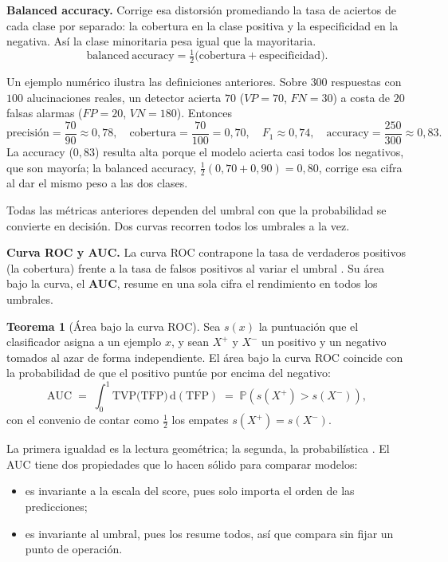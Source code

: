 \documentclass[12pt,a4paper]{report}
\theoremstyle{definition}
\newtheorem{teorema}{Teorema}
\begin{document}
\medskip
\noindent\textbf{Balanced accuracy.} Corrige esa distorsión promediando la tasa de aciertos de cada
clase por separado: la cobertura en la clase positiva y la especificidad en la negativa. Así la clase
minoritaria pesa igual que la mayoritaria.
\begin{equation}
\mathrm{balanced\ accuracy} = \tfrac12\big(\mathrm{cobertura}+\mathrm{especificidad}\big).
\label{eq:balacc}
\end{equation}

\medskip
Un ejemplo numérico ilustra las definiciones anteriores. Sobre $300$ respuestas con $100$ alucinaciones
reales, un detector acierta $70$ ($VP=70$, $FN=30$) a costa de $20$ falsas alarmas ($FP=20$, $VN=180$).
Entonces
\[
\mathrm{precisión}=\frac{70}{90}\approx0{,}78,\quad
\mathrm{cobertura}=\frac{70}{100}=0{,}70,\quad
F_1\approx0{,}74,\quad
\mathrm{accuracy}=\frac{250}{300}\approx0{,}83.
\]
La accuracy ($0{,}83$) resulta alta porque el modelo acierta casi todos los negativos, que son mayoría;
la balanced accuracy, $\tfrac12(0{,}70+0{,}90)=0{,}80$, corrige esa cifra al dar el mismo peso a las dos
clases.

\medskip
Todas las métricas anteriores dependen del umbral con que la probabilidad se convierte en decisión. Dos
curvas recorren todos los umbrales a la vez.

\medskip
\noindent\textbf{Curva ROC y AUC.} La curva ROC contrapone la tasa de verdaderos positivos (la cobertura)
frente a la tasa de falsos positivos al variar el umbral \cite{fawcett2006roc}. Su área bajo la curva,
el \textbf{AUC}, resume en una sola cifra el rendimiento en todos los umbrales.

\begin{teorema}[Área bajo la curva ROC]
Sea $s(x)$ la puntuación que el clasificador asigna a un ejemplo $x$, y sean $X^{+}$ y $X^{-}$ un
positivo y un negativo tomados al azar de forma independiente. El área bajo la curva ROC coincide con
la probabilidad de que el positivo puntúe por encima del negativo:
\[
\mathrm{AUC} \;=\; \int_0^1 \mathrm{TVP}\big(\mathrm{TFP}\big)\,\mathrm{d}(\mathrm{TFP})
\;=\; \mathbb{P}\!\left(s(X^{+}) > s(X^{-})\right),
\]
con el convenio de contar como $\tfrac12$ los empates $s(X^{+})=s(X^{-})$.
\end{teorema}

\noindent La primera igualdad es la lectura geométrica; la segunda, la probabilística
\cite{hanley1982roc}. El AUC tiene dos propiedades que lo hacen sólido para comparar modelos:

\begin{itemize}
\item es invariante a la escala del score, pues solo importa el orden de las predicciones;
\item es invariante al umbral, pues los resume todos, así que compara sin fijar un punto de operación.
\end{itemize}
\end{document}
